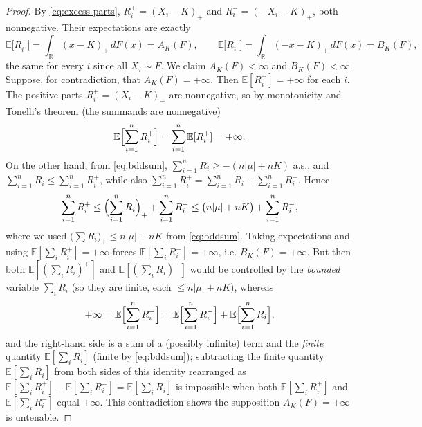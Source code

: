\documentclass{amsart}
\theoremstyle{definition}
\theoremstyle{remark}
\begin{document}
\begin{proof}
By \eqref{eq:excess-parts}, $R_i^+=(X_i-K)_+$ and $R_i^-=(-X_i-K)_+$, both nonnegative.
Their expectations are exactly
\[
\mathbb{E}\bigl[R_i^+\bigr]=\int_{\mathbb{R}}(x-K)_+\,dF(x)=A_K(F),
\qquad
\mathbb{E}\bigl[R_i^-\bigr]=\int_{\mathbb{R}}(-x-K)_+\,dF(x)=B_K(F),
\]
the same for every $i$ since all $X_i\sim F$. We claim $A_K(F)<\infty$ and $B_K(F)<\infty$.
Suppose, for contradiction, that $A_K(F)=+\infty$. Then $\mathbb{E}[R_i^+]=+\infty$ for each
$i$. The positive parts $R_i^+=(X_i-K)_+$ are nonnegative, so by monotonicity and
Tonelli's theorem (the summands are nonnegative)
\[
\mathbb{E}\Bigl[\sum_{i=1}^n R_i^+\Bigr]=\sum_{i=1}^n \mathbb{E}[R_i^+]=+\infty .
\]
On the other hand, from \eqref{eq:bddsum}, $\sum_{i=1}^n R_i\ge -(n|\mu|+nK)$ a.s., and
$\sum_{i=1}^n R_i\le \sum_{i=1}^n R_i^+$, while also
$\sum_{i=1}^n R_i^+=\sum_{i=1}^n R_i+\sum_{i=1}^n R_i^-$. Hence
\[
\sum_{i=1}^n R_i^+\le \Bigl(\sum_{i=1}^n R_i\Bigr)_+ +\sum_{i=1}^n R_i^-
\le \bigl(n|\mu|+nK\bigr)+\sum_{i=1}^n R_i^- ,
\]
where we used $\bigl(\sum R_i\bigr)_+\le n|\mu|+nK$ from \eqref{eq:bddsum}. Taking
expectations and using $\mathbb{E}[\sum_i R_i^+]=+\infty$ forces
$\mathbb{E}[\sum_i R_i^-]=+\infty$, i.e. $B_K(F)=+\infty$. But then both
$\mathbb{E}[(\sum_i R_i)^+]$ and $\mathbb{E}[(\sum_i R_i)^-]$ would be controlled by the
\emph{bounded} variable $\sum_i R_i$ (so they are finite, each $\le n|\mu|+nK$), whereas
\[
+\infty=\mathbb{E}\Bigl[\sum_{i=1}^n R_i^+\Bigr]
=\mathbb{E}\Bigl[\sum_{i=1}^n R_i^-\Bigr]+\mathbb{E}\Bigl[\sum_{i=1}^n R_i\Bigr],
\]
and the right-hand side is a sum of a (possibly infinite) term and the \emph{finite} quantity
$\mathbb{E}[\sum_i R_i]$ (finite by \eqref{eq:bddsum}); subtracting the finite quantity
$\mathbb{E}[\sum_i R_i]$ from both sides of this identity rearranged as
$\mathbb{E}[\sum_i R_i^+]-\mathbb{E}[\sum_i R_i^-]=\mathbb{E}[\sum_i R_i]$ is impossible when
both $\mathbb{E}[\sum_i R_i^+]$ and $\mathbb{E}[\sum_i R_i^-]$ equal $+\infty$. This
contradiction shows the supposition $A_K(F)=+\infty$ is untenable.


\end{proof}
\end{document}
